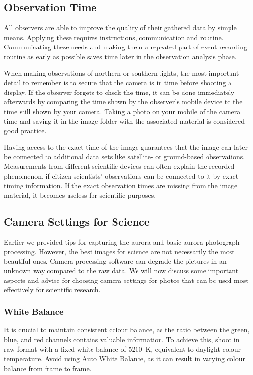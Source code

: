 \documentclass{article}
\begin{document}
\subsection{Observation Time}\label{sec:data_cit_time}

All observers are able to improve the quality of their gathered data by simple means. Applying these requires instructions, communication and routine. Communicating these needs and making them a repeated part of event recording routine as early as possible saves time later in the observation analysis phase.

When making observations of northern or southern lights, the most important detail to remember is to secure that the camera is in time before shooting a display. If the observer forgets to check the time, it can be done immediately afterwards by comparing the time shown by the observer's mobile device to the time still shown by your camera. Taking a photo on your mobile of the camera time and saving it in the image folder with the associated material is considered good practice. 

Having access to the exact time of the image guarantees that the image can later be connected to additional data sets like satellite- or ground-based observations. Measurements from different scientific devices can often explain the recorded phenomenon, if citizen scientists' observations can be connected to it by exact timing information. If the exact observation times are missing from the image material, it becomes useless for scientific purposes. 

\subsection{Camera Settings for Science}
Earlier we provided tips for capturing the aurora and basic aurora photograph processing. However, the best images for science are not necessarily the most beautiful ones. Camera processing software can degrade the pictures in an unknown way compared to the raw data. We will now discuss some important aspects and advise for choosing camera settings for photos that can be used most effectively for scientific research.

\subsubsection{White Balance}
It is crucial to maintain consistent colour balance, as the ratio between the green, blue, and red channels contains valuable information. To achieve this, shoot in raw format with a fixed white balance of 5200~K, equivalent to daylight colour temperature. Avoid using Auto White Balance, as it can result in varying colour balance from frame to frame.
\end{document}
